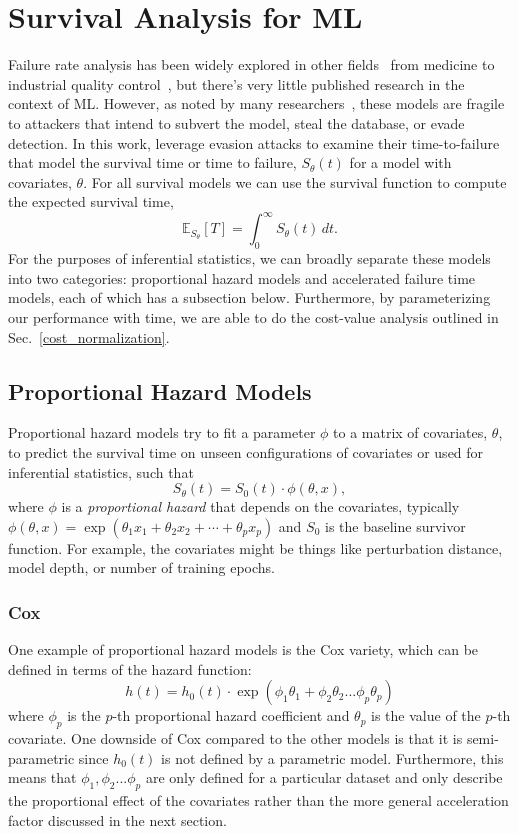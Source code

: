
\section{Survival Analysis for ML} 
\label{afr_models}
Failure rate analysis has been widely explored in other fields~\citep{aft_models} from medicine to industrial quality control~\citep{ai_medical_imaging,ai_industry,ai_aviation,ai_luggage,ai_security,ai_prison}, but there's very little published research in the context of ML. However, as noted by many researchers~\citep{madry2017towards, carlini_towards_2017, croce_reliable_2020, meyers}, these models are fragile to attackers that intend to subvert the model, steal the database, or evade detection.  In this work, leverage evasion attacks to examine their time-to-failure   that model the survival time or time to failure, $S_{\theta}(t)$ for a model with covariates, $\theta$. For all survival models we can use the survival function to compute the expected survival time,
\[
	\mathbb{E}_{S_\theta}[T] = \int_0^{\infty}S_\theta(t) \,dt.
\]
For the purposes of inferential statistics, we can broadly separate these models into two categories: proportional hazard models and accelerated failure time models, each of which has a subsection below. Furthermore, by parameterizing our performance with time, we are able to do the cost-value analysis outlined in Sec.~\ref{cost_normalization}.

\subsection{Proportional Hazard Models}
Proportional hazard models try to fit a parameter $\phi$ to a matrix of covariates, $\theta$, to predict the survival time on unseen configurations of covariates or used for inferential statistics, such that
$$
S_\theta(t) = S_0(t) \cdot \phi(\theta, x), 
$$
where $\phi$ is a \textit{proportional hazard} that depends on the covariates, typically $\phi(\theta, x) = \exp{(\theta_1 x_1 + \theta_2 x_2 + \cdots + \theta_p x_p)}$ and $S_0$ is the baseline survivor function. For example, the covariates might be things like perturbation distance, model depth, or number of training epochs.


\subsubsection{Cox}
One example of proportional hazard models is the Cox variety, which can be defined in terms of the hazard function:
$$
h(t) = h_0(t) \cdot \exp(\phi_1 \theta_1 + \phi_2 \theta_2... \phi_p \theta_p)
$$
where $\phi_p$ is the $p$-th proportional hazard coefficient and $\theta_p$ is the value of the $p$-th covariate. One downside of Cox compared to the other models is that it is semi-parametric since $h_0(t)$ is not defined by a parametric model. Furthermore, this means that $\phi_1, \phi_2... \phi_p$ are only defined for a particular dataset and only describe the proportional effect of the covariates rather than the more general acceleration factor discussed in the next section.


